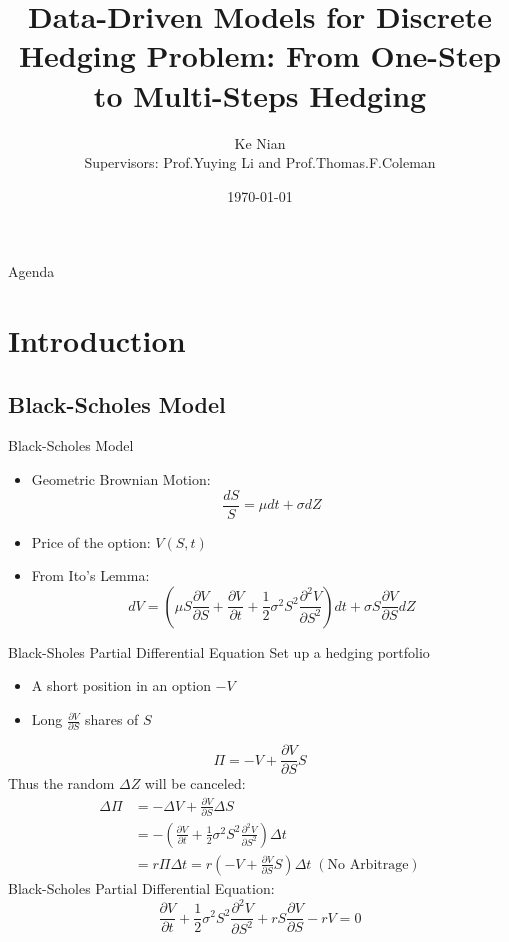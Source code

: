 \documentclass[10pt,table,mathserif]{beamer}
\title[Data-Driven Models for Discrete
Hedging Problem ]%
{Data-Driven Models for   Discrete
Hedging Problem: From One-Step to Multi-Steps Hedging}
\author[Ke Nian ] %
{ Ke Nian\\
 Supervisors: Prof.Yuying Li and Prof.Thomas.F.Coleman
}
\institute[
  David R. Cheriton School of Computer Science, University of Waterloo
] %
{%
  David R. Cheriton School of Computer Science,\\
  University of Waterloo,\\
  Waterloo, Canada
}
\date{\today}
\begin{document}
\begin{frame}[plain] %
  \titlepage
\end{frame}

\begin{frame}{Agenda}{}
\tableofcontents
\end{frame}

\section{Introduction}
\subsection{Black-Scholes Model}
\begin{frame}{Black-Scholes Model}
\begin{itemize}
	\item Geometric Brownian Motion:
	\[
	\frac{d S}{ S}= \mu dt +\sigma dZ
	\]
	\item Price of the option: $V(S,t)$
	\item From Ito's Lemma:
	\[
	dV=(\mu S\frac{\partial V}{\partial S}+ \frac{\partial V}{\partial t} +\frac{1}{2}\sigma^2 S^2 \frac{\partial^2 V}{\partial S^2})dt + \sigma S \frac{\partial V}{\partial S} dZ
	\]
\end{itemize}
\end{frame}

\begin{frame}{Black-Sholes Partial Differential Equation}
Set up a hedging portfolio
\begin{itemize}
	\item A short position in an option $-V$
	\item Long $\frac{\partial V}{\partial S}$ shares of $S$
\end{itemize}
\[
\Pi=-V+\frac{\partial V}{\partial S} S
\]
Thus the random $\Delta Z$ will be canceled:
\[
\begin{split}
\Delta \Pi&=-\Delta V+ \frac{\partial V}{\partial S} \Delta S \\
&=-(\frac{\partial V}{\partial t} +\frac{1}{2}\sigma^2 S^2 \frac{\partial^2 V}{\partial S^2}) \Delta t\\
&=r \Pi \Delta t=r(-V+\frac{\partial V}{\partial S} S)\Delta  t \; (\text{No Arbitrage})
\end{split}
\]
Black-Scholes Partial Differential Equation:
\[
\frac{\partial V}{\partial t} +\frac{1}{2}\sigma^2 S^2 \frac{\partial^2 V}{\partial S^2}+rS\frac{\partial V}{\partial S} -rV =0
\]
\end{frame}
\end{document}
